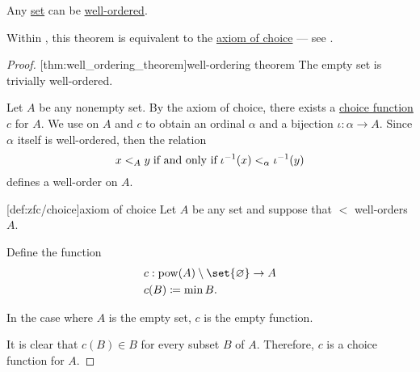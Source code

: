\begin{theorem}\label{thm:well_ordering_theorem}
  Any \hyperref[def:set]{set} can be \hyperref[def:well_ordered_set]{well-ordered}.
\end{theorem}
\begin{comments}
  \item Within \hyperref[def:zfc]{}, this theorem is equivalent to the \hyperref[def:zfc/choice]{axiom of choice} --- see .
\end{comments}
\begin{proof}
  [thm:well_ordering_theorem]{well-ordering theorem} The empty set is trivially well-ordered.

  Let \( A \) be any nonempty set. By the axiom of choice, there exists a \hyperref[def:choice_function]{choice function} \( c \) for \( A \). We use  on \( A \) and \( c \) to obtain an ordinal \( \alpha \) and a bijection \( \iota: \alpha \to A \). Since \( \alpha \) itself is well-ordered, then the relation
  \begin{equation*}
    x <_A y \T{if and only if} \iota^{-1}(x) <_\alpha \iota^{-1}(y)
  \end{equation*}
  defines a well-order on \( A \).

  [def:zfc/choice]{axiom of choice} Let \( A \) be any set and suppose that \( < \) well-orders \( A \).

  Define the function
  \begin{equation*}
    \begin{aligned}
      &c: \pow(A) \setminus \set{ \varnothing } \to A \\
      &c(B) \coloneqq \min B.
    \end{aligned}
  \end{equation*}

  In the case where \( A \) is the empty set, \( c \) is the empty function.

  It is clear that \( c(B) \in B \) for every subset \( B \) of \( A \). Therefore, \( c \) is a choice function for \( A \).
\end{proof}
